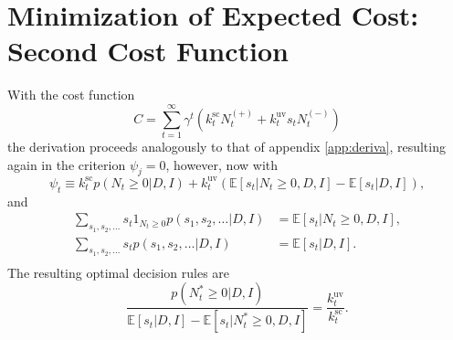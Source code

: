 \section{Minimization of Expected Cost: Second Cost Function}
\label{app:deriv}
With the cost function
\begin{equation}
	C = \sum_{t=1}^{\infty}\gamma^{t}(k^\text{sc}_{t}N_{t}^{(+)}+k_{t}^\text{uv}s_tN_{t}^{(-)})
\end{equation}
the derivation proceeds analogously to that of appendix \ref{app:deriva}, resulting again in the criterion $\psi_j=0$, however, now with
\begin{equation}
	\psi_t\equiv k^\text{sc}_{t}p(N_t\geq 0|D,I)+k_{t}^\text{uv}(\mathbb{E}[s_t|N_{t}\geq 0,D,I]-\mathbb{E}[s_t|D,I]),
\end{equation} 
and
\begin{equation}
	\begin{split}
		\sum_{s_1,s_2,\dots}s_{t}1_{N_{t}\geq 0}p(s_1,s_{2},\dots|D,I)&=\mathbb{E}[s_t|N_{t}\geq 0,D,I],\\
		\sum_{s_1,s_2,\dots}s_{t}p(s_1,s_{2},\dots|D,I)&=\mathbb{E}[s_t|D,I].\\
	\end{split}
\end{equation}
The resulting optimal decision rules are
\begin{equation}
	\frac{p(N_t^*\geq 0|D,I)}{\mathbb{E}[s_t|D,I]-\mathbb{E}[s_t|N_t^*\geq 0,D,I]}=\frac{k_{t}^\text{uv}}{k^\text{sc}_{t}}.
\end{equation}
